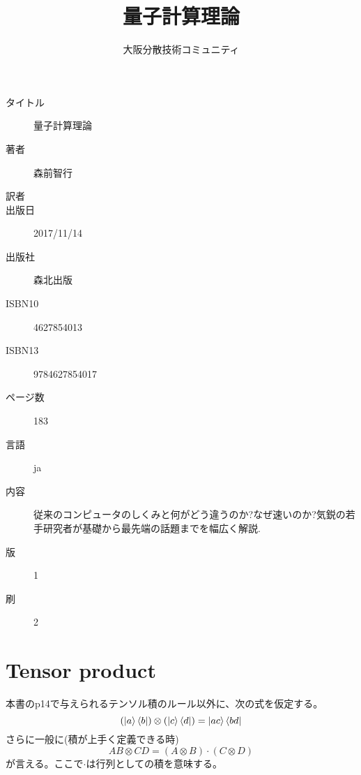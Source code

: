 \documentclass[b5paper,fleqn]{ltjsarticle}
\title{量子計算理論}
\author{大阪分散技術コミュニティ}
\begin{document}
\maketitle
\begin{description}
\item [タイトル] 量子計算理論
\item [著者] 森前智行
\item [訳者] 
\item [出版日] 2017/11/14
\item [出版社] 森北出版
\item [ISBN10] 4627854013
\item [ISBN13] 9784627854017
\item [ページ数] 183
\item [言語] ja
\item [内容]従来のコンピュータのしくみと何がどう違うのか?なぜ速いのか?気鋭の若手研究者が基礎から最先端の話題までを幅広く解説.
  \vskip5pt
\item [版]1 
\item [刷]2
\end{description}

\section{Tensor product}
本書のp14で与えられるテンソル積のルール以外に、次の式を仮定する。
\[(\ket{a}\bra{b})\otimes(\ket{c}\bra{d})=\ket{ac}\bra{bd}\]
さらに一般に(積が上手く定義できる時)
\[AB\otimes CD=(A\otimes B)\cdot(C\otimes D)\]
が言える。ここで$\cdot$は行列としての積を意味する。
\end{document}
